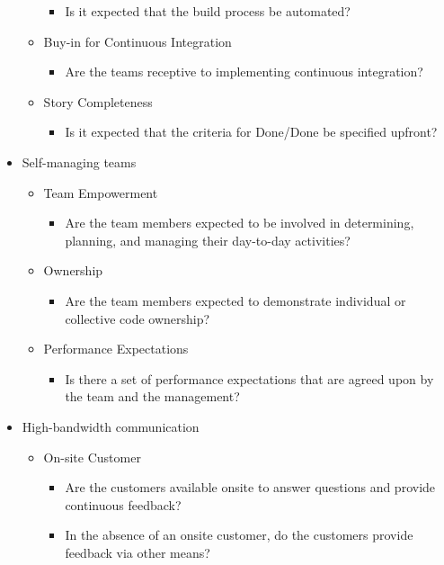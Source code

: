 \begin{appendices}
\begin{itemize}
\begin{itemize}
\begin{itemize}
					\item Is it expected that the build process be automated?
				\end{itemize}
			\item Buy-in for Continuous Integration
				\begin{itemize}
					\item Are the teams receptive to implementing continuous integration?
				\end{itemize}
			\item Story Completeness
				\begin{itemize}
					\item Is it expected that the criteria for Done/Done be specified upfront?
				\end{itemize}
		\end{itemize}
	\item Self-managing teams
		\begin{itemize}
			\item Team Empowerment
				\begin{itemize}
					\item Are the team members expected to be involved in determining, planning, and managing their day-to-day activities?
				\end{itemize}
			\item Ownership
				\begin{itemize}
					\item Are the team members expected to demonstrate individual or collective code ownership? 
				\end{itemize}
			\item Performance Expectations
				\begin{itemize}
					\item Is there a set of performance expectations that are agreed upon by the team and the management?
				\end{itemize}
		\end{itemize}
	\item High-bandwidth communication
		\begin{itemize}
			\item On-site Customer
				\begin{itemize}
					\item Are the customers available onsite to answer questions and provide continuous feedback? 
					\item In the absence of an onsite customer, do the customers provide feedback via other means? 

\end{itemize}
\end{itemize}
\end{itemize}
\end{appendices}
